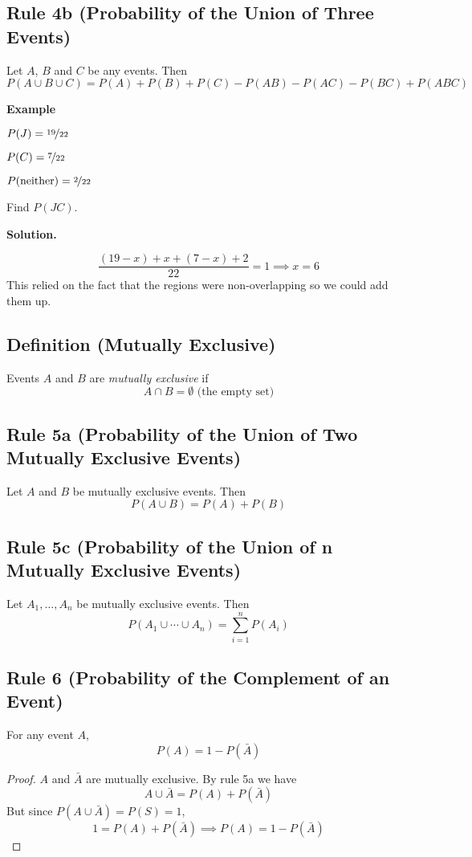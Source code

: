 \begin{thmbox}
    \subsection{Rule 4b (Probability of the Union of Three Events)}
    Let $ A $, $ B $ and $ C $ be any events. Then
    \[ P(A\cup B\cup C)=P(A)+P(B)+P(C)-P(AB)-P(AC)-P(BC)+P(ABC) \]
\end{thmbox}

\textbf{Example}

$ P(J)=\nicefrac{19}{22}  $

$ P(C)=\nicefrac{7}{22} $

$ P(\text{neither})=\nicefrac{2}{22}  $

Find $ P(JC) $.

\textbf{Solution.}

\[ \frac{(19-x)+x+(7-x)+2}{22}=1\implies x=6 \]
This relied on the fact that the regions were non-overlapping so we could add
them up.

\begin{defbox}
    \subsection{Definition (Mutually Exclusive)}
    Events $ A $ and $ B $ are \emph{mutually exclusive} if
    \[ A\cap B=\emptyset \text{ (the empty set)} \]
\end{defbox}

\begin{thmbox}
    \subsection{Rule 5a (Probability of the Union of Two Mutually Exclusive Events)}
    Let $ A $ and $ B $ be mutually exclusive events. Then
    \[ P(A\cup B)=P(A)+P(B) \]
\end{thmbox}

\begin{thmbox}
    \subsection{Rule 5c (Probability of the Union of n Mutually Exclusive Events)}
    Let $ A_1,\ldots ,A_n $ be mutually exclusive events. Then
    \[ P(A_1\cup \cdots \cup A_n)=\sum\limits_{i=1}^{n} P(A_i) \]
\end{thmbox}

\begin{thmbox}
    \subsection{Rule 6 (Probability of the Complement of an Event)}
    For any event $ A $,
    \[ P(A)=1-P(\bar{A}) \]
\end{thmbox}
\begin{proof}
    $ A $ and $ \bar{A} $ are mutually exclusive. By rule 5a we have
    \[ A\cup \bar{A}=P(A)+P(\bar{A}) \]
    But since $ P(A\cup \bar{A})=P(S)=1 $,
    \[ 1=P(A)+P(\bar{A})\implies P(A)=1-P(\bar{A}) \]
\end{proof}
